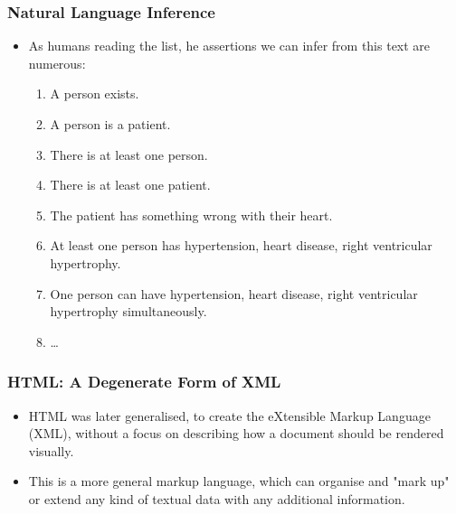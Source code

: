 \documentclass[aspectratio=169]{beamer} %
\begin{document}
\begin{frame}
\frametitle{Natural Language Inference}

\begin{itemize}

\item As humans reading the list, he assertions we can infer from this text are numerous:

\begin{enumerate}
  \item A person exists.
  \item A person is a patient.
  \item There is at least one person.
  \item There is at least one patient.
  \item The patient has something wrong with their heart.
  \item At least one person has hypertension, heart disease, right ventricular hypertrophy.
  \item One person can have hypertension, heart disease, right ventricular hypertrophy simultaneously.
  \item \ldots
\end{enumerate}

\end{itemize}

\end{frame}

\begin{frame}
\frametitle{HTML: A Degenerate Form of XML}

\begin{itemize}
  \item HTML was later generalised, to create the eXtensible Markup Language
  (XML), without a focus on describing how a document should be rendered
  visually.
  \item This is a more general markup language, which can organise and "mark up" 
  or extend any kind of textual data with any additional information.
\end{itemize}

\end{frame}
\end{document}
